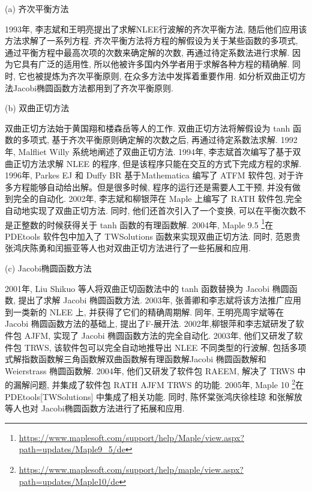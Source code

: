 (a) 齐次平衡方法

1993年, 李志斌和王明亮\cite{zhibin1993travelling}提出了求解NLEE行波解的齐次平衡方法, 随后他们应用该方法求解了一系列方程\cite{wang1995solitary,wang1996application}. 齐次平衡方法将方程的解假设为关于某些函数的多项式, 通过平衡方程中最高次项的次数来确定解的次数, 再通过待定系数法进行求解. 因为它具有广泛的适用性, 所以他被许多国内外学者用于求解各种方程的精确解\cite{hbm1998,hbm1998b,hbm1999,senthilvelan2001extended,zhao2002new,feng2004comment,rady2010homogeneous,eslami2014exact,nguyen2015modified}. 同时, 它也被提炼为齐次平衡原则, 在众多方法中发挥着重要作用. 如\Painleve{}分析\D 双曲正切方法\D Jacobi椭圆函数方法都用到了齐次平衡原则. 

(b) 双曲正切方法 

双曲正切方法始于黄国翔和楼森岳等人\cite{huang1989exact}的工作. 双曲正切方法将解假设为 tanh 函数的多项式, 基于齐次平衡原则确定解的次数之后, 再通过待定系数法求解. 1992年, Malfliet Willy \cite{malfliet1992solitary}系统地阐述了双曲正切方法. 1994年, 李志斌\cite{li_book_2007}首次编写了基于双曲正切方法求解 NLEE 的程序, 但是该程序只能在交互的方式下完成方程的求解. 1996年, Parkes EJ 和 Duffy BR \cite{parkes1996automated}基于Mathematica 编写了 ATFM 软件包, 对于许多方程能够自动给出解。但是很多时候, 程序的运行还是需要人工干预, 并没有做到完全的自动化. 2002年, 李志斌和柳银萍\cite{liu2001master,li2002rath}在 Maple 上编写了 RATH 软件包,完全自动地实现了双曲正切方法. 同时, 他们还首次引入了一个变换, 可以在平衡次数不是正整数的时候获得关于 tanh 函数的有理函数解. 2004年, Maple 9.5 \footnote{\url{https://www.maplesoft.com/support/help/Maple/view.aspx?path=updates/Maple9_5/de}}在 PDEtools 软件包中加入了 TWSolutions 函数来实现双曲正切方法. 同时, 范恩贵\cite{fan2000extended}\D 张鸿庆\D 陈勇\cite{zheng2003generalized}和闰振亚\cite{yan2001new}等人也对双曲正切方法进行了一些拓展和应用. 

(c) Jacobi椭圆函数方法

2001年, Liu Shikuo 等人\cite{liu2001jacobi}将双曲正切函数法中的 tanh 函数替换为 Jacobi 椭圆函数, 提出了求解 Jacobi 椭圆函数方法. 2003年, 张善卿和李志斌\cite{zhang2003jacobi}将该方法推广应用到一类新的 NLEE 上, 并获得了它们的精确周期解. 同年, 王明亮\D 周宇斌等\cite{zhou2003periodic}在 Jacobi 椭圆函数方法的基础上, 提出了F-展开法. 2002年,柳银萍和李志斌\cite{yin2002automated}研发了软件包 AJFM, 实现了 Jacobi 椭圆函数方法的完全自动化. 2003年, 他们\cite{yin2003automated}又研发了软件包 TRWS, 该软件包可以完全自动地推导出 NLEE 不同类型的行波解, 包括多项式解\D 指数函数解\D 三角函数解\D 双曲函数解\D 有理函数解\D Jacobi 椭圆函数解和 Weierstrass 椭圆函数解. 2004年, 他们\cite{li2004raeem}又研发了软件包 RAEEM, 解决了 TRWS 中的漏解问题, 并集成了软件包 RATH \D AJFM \D TRWS 的功能. 2005年, Maple 10 \footnote{\url{https://www.maplesoft.com/support/help/maple/view.aspx?path=updates/Maple10/de}}在 PDEtools[TWSolutions] 中集成了相关功能. 同时, 陈怀棠\cite{chen2003improved}\D 张鸿庆\cite{wang2005new}\D 徐桂琼\cite{gui2005applications} 和张解放\cite{chao2005symbolic}等人也对 Jacobi椭圆函数方法进行了拓展和应用. 

